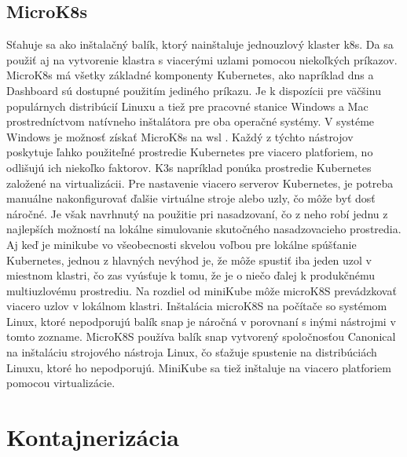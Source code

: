 \subsection*{MicroK8s}
Sťahuje sa ako inštalačný balík, ktorý nainštaluje jednouzlový klaster \acrshort{k8s}. Da sa použiť aj na vytvorenie klastra s viacerými uzlami pomocou niekoľkých príkazov. MicroK8s má všetky základné komponenty Kubernetes, ako napríklad \acrshort{dns} a Dashboard sú dostupné použitím jediného príkazu. Je k dispozícii pre väčšinu populárnych distribúcií Linuxu a tiež pre pracovné stanice Windows a Mac prostredníctvom natívneho inštalátora pre oba operačné systémy. V systéme Windows je možnosť získať MicroK8s na \acrshort{wsl} \cite{comparetool}.
\newline
\newline
Každý z týchto nástrojov poskytuje ľahko použiteľné prostredie Kubernetes pre viacero platforiem, no odlišujú ich niekoľko faktorov. K3s napríklad ponúka prostredie Kubernetes založené na virtualizácii. Pre nastavenie viacero serverov Kubernetes, je potreba manuálne nakonfigurovať ďalšie virtuálne stroje alebo uzly, čo môže byť dosť náročné. Je však navrhnutý na použitie pri nasadzovaní, čo z neho robí jednu z najlepších možností na lokálne simulovanie skutočného nasadzovacieho prostredia. Aj keď je minikube vo všeobecnosti skvelou voľbou pre lokálne spúšťanie Kubernetes, jednou z hlavných nevýhod je, že môže spustiť iba jeden uzol v miestnom klastri, čo zas vyúsťuje k tomu, že je o niečo ďalej k produkčnému multiuzlovému prostrediu. Na rozdiel od miniKube môže microK8S prevádzkovať viacero uzlov v lokálnom klastri. Inštalácia microK8S na počítače so systémom Linux, ktoré nepodporujú balík snap je náročná v porovnaní s inými nástrojmi v tomto zozname. MicroK8S používa balík snap vytvorený spoločnosťou Canonical na inštaláciu strojového nástroja Linux, čo sťažuje spustenie na distribúciách Linuxu, ktoré ho nepodporujú. MiniKube sa tiež inštaluje na viacero platforiem pomocou virtualizácie.

\section{Kontajnerizácia}

